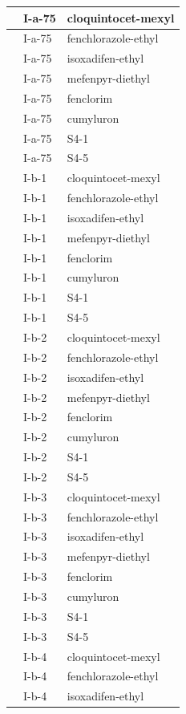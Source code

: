 \documentclass[11pt,a4paper]{article}
\begin{document}
\begin{table}[h]
\begin{tabular}{|l|l|l|}
 & I-a-75 & cloquintocet-mexyl \\ \hline
 & I-a-75 & fenchlorazole-ethyl \\ \hline
 & I-a-75 & isoxadifen-ethyl \\ \hline
 & I-a-75 & mefenpyr-diethyl \\ \hline
 & I-a-75 & fenclorim \\ \hline
 & I-a-75 & cumyluron \\ \hline
 & I-a-75 & S4-1 \\ \hline
 & I-a-75 & S4-5 \\ \hline
 & I-b-1 & cloquintocet-mexyl \\ \hline
 & I-b-1 & fenchlorazole-ethyl \\ \hline
 & I-b-1 & isoxadifen-ethyl \\ \hline
 & I-b-1 & mefenpyr-diethyl \\ \hline
 & I-b-1 & fenclorim \\ \hline
 & I-b-1 & cumyluron \\ \hline
 & I-b-1 & S4-1 \\ \hline
 & I-b-1 & S4-5 \\ \hline
 & I-b-2 & cloquintocet-mexyl \\ \hline
 & I-b-2 & fenchlorazole-ethyl \\ \hline
 & I-b-2 & isoxadifen-ethyl \\ \hline
 & I-b-2 & mefenpyr-diethyl \\ \hline
 & I-b-2 & fenclorim \\ \hline
 & I-b-2 & cumyluron \\ \hline
 & I-b-2 & S4-1 \\ \hline
 & I-b-2 & S4-5 \\ \hline
 & I-b-3 & cloquintocet-mexyl \\ \hline
 & I-b-3 & fenchlorazole-ethyl \\ \hline
 & I-b-3 & isoxadifen-ethyl \\ \hline
 & I-b-3 & mefenpyr-diethyl \\ \hline
 & I-b-3 & fenclorim \\ \hline
 & I-b-3 & cumyluron \\ \hline
 & I-b-3 & S4-1 \\ \hline
 & I-b-3 & S4-5 \\ \hline
 & I-b-4 & cloquintocet-mexyl \\ \hline
 & I-b-4 & fenchlorazole-ethyl \\ \hline
 & I-b-4 & isoxadifen-ethyl \\ \hline

\end{tabular}
\end{table}
\end{document}
